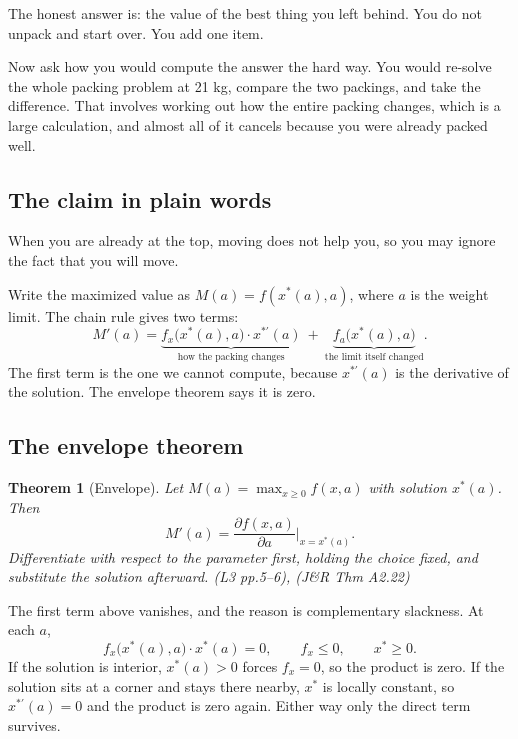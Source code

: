\documentclass[11pt,letterpaper]{article}
\theoremstyle{definition}
\theoremstyle{plain}
\newtheorem{thm}{Theorem}
\newcommand{\src}[1]{{\small\textsf{(#1)}}}
\newcommand{\skipnote}{\noindent{\small\textsf{Proof. Skippable on a first read.}}\par\smallskip}
\begin{document}
The honest answer is: the value of the best thing you left behind. You do not unpack and start over.
You add one item.

Now ask how you would compute the answer the hard way. You would re-solve the whole packing problem
at 21 kg, compare the two packings, and take the difference. That involves working out how the entire
packing changes, which is a large calculation, and almost all of it cancels because you were already
packed well.

\subsection{The claim in plain words}

When you are already at the top, moving does not help you, so you may ignore the fact that you will
move.

Write the maximized value as $M(a) = f(x^*(a), a)$, where $a$ is the weight limit. The chain rule
gives two terms:
\[
M'(a) = \underbrace{f_x\big(x^*(a),a\big) \cdot x^{*\prime}(a)}_{\text{how the packing changes}}
\ + \ \underbrace{f_a\big(x^*(a),a\big)}_{\text{the limit itself changed}} .
\]
The first term is the one we cannot compute, because $x^{*\prime}(a)$ is the derivative of the
solution. The envelope theorem says it is zero.

\subsection{The envelope theorem}

\begin{thm}[Envelope] Let $M(a) = \max_{x \ge 0} f(x,a)$ with solution $x^*(a)$. Then
\[
M'(a) = \frac{\partial f(x,a)}{\partial a} \bigg|_{x = x^*(a)} .
\]
Differentiate with respect to the parameter first, holding the choice fixed, and substitute the
solution afterward. \src{L3 pp.5--6}, \src{J\&R Thm A2.22}
\end{thm}

\skipnote
\begin{leftbar}
\small
The first term above vanishes, and the reason is complementary slackness. At each $a$,
\[
f_x\big(x^*(a),a\big) \cdot x^*(a) = 0, \qquad f_x \le 0, \qquad x^* \ge 0 .
\]
If the solution is interior, $x^*(a) > 0$ forces $f_x = 0$, so the product is zero. If the solution
sits at a corner and stays there nearby, $x^*$ is locally constant, so $x^{*\prime}(a) = 0$ and the
product is zero again. Either way only the direct term survives.
\end{leftbar}
\end{document}

